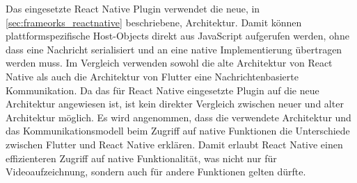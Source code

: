 Das eingesetzte React Native Plugin verwendet die neue, in \autoref{sec:frameorks_reactnative} beschriebene, Architektur.
Damit können plattformspezifische Host-Objects direkt aus JavaScript aufgerufen werden, ohne dass eine Nachricht serialisiert und an eine native Implementierung übertragen werden muss.
Im Vergleich verwenden sowohl die alte Architektur von React Native als auch die Architektur von Flutter eine Nachrichtenbasierte Kommunikation.
Da das für React Native eingesetzte Plugin auf die neue Architektur angewiesen ist, ist kein direkter Vergleich zwischen neuer und alter Architektur möglich.
Es wird angenommen, dass die verwendete Architektur und das Kommunikationsmodell beim Zugriff auf native Funktionen die Unterschiede zwischen Flutter und React Native erklären.
Damit erlaubt React Native einen effizienteren Zugriff auf native Funktionalität, was nicht nur für Videoaufzeichnung, sondern auch für andere Funktionen gelten dürfte.